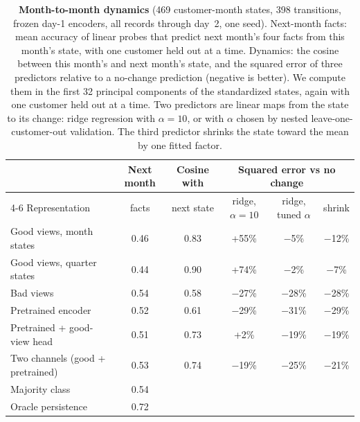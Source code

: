 \documentclass[11pt]{article}
\begin{document}
\begin{table}[h]
\centering
\small
\caption{\textbf{Month-to-month dynamics} (469 customer-month states, 398 transitions, frozen day-1 encoders, all records through day~2, one seed). Next-month facts: mean accuracy of linear probes that predict next month's four facts from this month's state, with one customer held out at a time. Dynamics: the cosine between this month's and next month's state, and the squared error of three predictors relative to a no-change prediction (negative is better). We compute them in the first 32 principal components of the standardized states, again with one customer held out at a time. Two predictors are linear maps from the state to its change: ridge regression with $\alpha = 10$, or with $\alpha$ chosen by nested leave-one-customer-out validation. The third predictor shrinks the state toward the mean by one fitted factor.}
\label{tab:time}
\setlength{\tabcolsep}{4pt}\begin{tabular}{lccccc}
\toprule
& Next month & Cosine with & \multicolumn{3}{c}{Squared error vs no change} \\
\cmidrule(lr){4-6}
Representation & facts & next state & ridge, $\alpha = 10$ & ridge, tuned $\alpha$ & shrink \\
\midrule
Good views, month states & 0.46 & 0.83 & +55\% & $-$5\% & $-$12\% \\
Good views, quarter states & 0.44 & 0.90 & +74\% & $-$2\% & $-$7\% \\
Bad views & 0.54 & 0.58 & $-$27\% & $-$28\% & $-$28\% \\
Pretrained encoder & 0.52 & 0.61 & $-$29\% & $-$31\% & $-$29\% \\
Pretrained + good-view head & 0.51 & 0.73 & +2\% & $-$19\% & $-$19\% \\
Two channels (good + pretrained) & 0.53 & 0.74 & $-$19\% & $-$25\% & $-$21\% \\
\midrule
Majority class & 0.54 & & & & \\
Oracle persistence & 0.72 & & & & \\
\bottomrule
\end{tabular}
\end{table}
\end{document}
